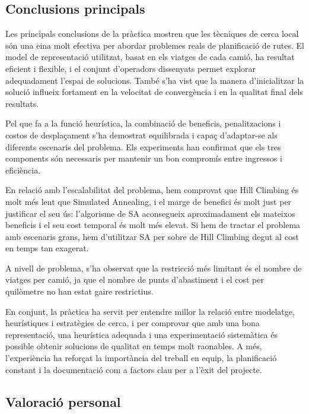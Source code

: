 \vspace{0.5cm}


\subsection{Conclusions principals}
Les principals conclusions de la pràctica mostren que les tècniques de cerca local són una eina molt efectiva per abordar problemes reals de planificació de rutes. El model de representació utilitzat, basat en els viatges de cada camió, ha resultat eficient i flexible, i el conjunt d’operadors dissenyats permet explorar adequadament l’espai de solucions. També s’ha vist que la manera d’inicialitzar la solució influeix fortament en la velocitat de convergència i en la qualitat final dels resultats.

Pel que fa a la funció heurística, la combinació de beneficis, penalitzacions i costos de desplaçament s’ha demostrat equilibrada i capaç d’adaptar-se als diferents escenaris del problema. Els experiments han confirmat que els tres components són necessaris per mantenir un bon compromís entre ingressos i eficiència. 

En relació amb l'escalabilitat del problema, hem comprovat que Hill Climbing és molt més lent que Simulated Annealing, i el marge de benefici és molt just per justificar el seu ús: l'algorisme de SA aconsegueix aproximadament els mateixos beneficis i el seu cost temporal és molt més elevat. Si hem de tractar el problema amb escenaris grans, hem d'utilitzar SA per sobre de Hill Climbing degut al cost en temps tan exagerat.

A nivell de problema, s’ha observat que la restricció més limitant és el nombre de viatges per camió, ja que el nombre de punts d'abastiment i el cost per quilòmetre no han estat gaire restrictius.

En conjunt, la pràctica ha servit per entendre millor la relació entre modelatge, heurístiques i estratègies de cerca, i per comprovar que amb una bona representació, una heurística adequada i una experimentació sistemàtica és possible obtenir solucions de qualitat en temps molt raonables. A més, l’experiència ha reforçat la importància del treball en equip, la planificació constant i la documentació com a factors clau per a l’èxit del projecte. 

\vspace{0.5cm}


\subsection{Valoració personal}


